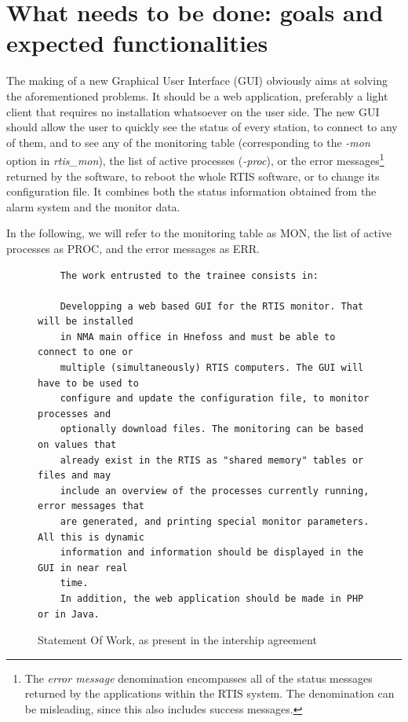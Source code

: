 \documentclass{themeensg}
\begin{document}
\clearpage

\section{What needs to be done: goals and expected functionalities}

The making of a new Graphical User Interface (GUI) obviously aims at solving the aforementioned problems. It should be a web application, preferably a light client that requires no installation whatsoever on the user side. The new GUI should allow the user to quickly see the status of every station, to connect to any of them, and to see any of the monitoring table (corresponding to the \textit{-mon} option in \textit{rtis\_mon}), the list of active processes (\textit{-proc}), or the error messages\footnote{The \textit{error message} denomination encompasses all of the status messages returned by the applications within the RTIS system. The denomination can be misleading, since this also includes success messages.} returned by the software, to reboot the whole RTIS software, or to change its configuration file. It combines both the status information obtained from the alarm system and the monitor data. 

In the following, we will refer to the monitoring table as MON, the list of active processes as PROC, and the error messages as ERR.\\

\begin{figure}[ht]
	\begin{verbatim}
	The work entrusted to the trainee consists in:
	
	Developping a web based GUI for the RTIS monitor. That will be installed
	in NMA main office in Hnefoss and must be able to connect to one or
	multiple (simultaneously) RTIS computers. The GUI will have to be used to
	configure and update the configuration file, to monitor processes and
	optionally download files. The monitoring can be based on values that
	already exist in the RTIS as "shared memory" tables or files and may
	include an overview of the processes currently running, error messages that
	are generated, and printing special monitor parameters. All this is dynamic
	information and information should be displayed in the GUI in near real
	time.
	In addition, the web application should be made in PHP or in Java.
	\end{verbatim}
	\caption{Statement Of Work, as present in the intership agreement}
\end{figure}
\end{document}
